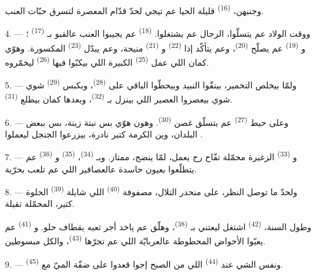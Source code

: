 وجنبهن،  \textsuperscript{(16)} قليلة الحيا عم تيجي لحدّ
قدّام المعصرة لتسرق حبّات العنب.

4. --- ووقت الولاد عم يتسلّوا، الرجال عم يشتغلوا. 
\textsuperscript{(18)} عم يجيبوا العنب عالقبو بـ
\textsuperscript{(17)} ؛ و \textsuperscript{(19)} عم
يصلّح  \textsuperscript{(20)}، وعم يتأكّد إذا
 \textsuperscript{(22)} و
\textsuperscript{(21)} منيحة، وعم يبدّل 
\textsuperscript{(23)} المكسورة. وهوّي كمان اللي عمل 
\textsuperscript{(25)} الكبيرة اللي بيكبّوا فيها 
\textsuperscript{(26)} ليخمّروه.

5. --- ولمّا بيخلص التخمير، بينقّوا النبيد وبيحطّوا الباقي على
 \textsuperscript{(28)}، وبكبس 
\textsuperscript{(29)} شوي شوي بيعصروا العصير اللي بينزل بـ \textsuperscript{(32)}، وبعدها كمان بيطلع 
\textsuperscript{(31)}.

\VUsaut{6.0mm}
\VUsaut{3.4mm}

6. --- وعلى حيط  \textsuperscript{(27)} عم يتسلّق غصن
 \textsuperscript{(30)}. وهون هوّي بس نبتة زينة، بس ببعض
البلدان، وين الكرمة كتير نادرة، بيزرعوا الجنجل ليعملوا
.

7. --- و \textsuperscript{(33)} الزغيرة محمّلة تفّاح
رح يعمل، لمّا ينضج،  ممتاز. وبـ
\textsuperscript{(34)}،  \textsuperscript{(35)}
و \textsuperscript{(36)} عم يتطلّعوا بعيون حاسدة عالعصافير
اللي عم تلعب بحرّية.

8. --- ولحدّ ما توصل النظر، على منحدر التلال، مصفوفة  \textsuperscript{(40)} اللي شايلة 
\textsuperscript{(39)} الحلوة كتير، المحمّلة  تقيلة.

وطول السنة،  \textsuperscript{(42)} اشتغل ليعتني
بـ \textsuperscript{(38)}، وهلّق عم ياخد أجر تعبه بقطاف حلو.
و \textsuperscript{(41)} عم يعبّوا الأحواض المحطوطة
عالعربايّة اللي عم تجرّها  \textsuperscript{(43)}، والكل
مبسوطين.

\VUsaut{5.0mm}
\VUsaut{3.4mm}

9. --- ونفس الشي عند  \textsuperscript{(44)}
اللي من الصبح إجوا قعدوا على ضفّة الميّ مع 
\textsuperscript{(45)}.

